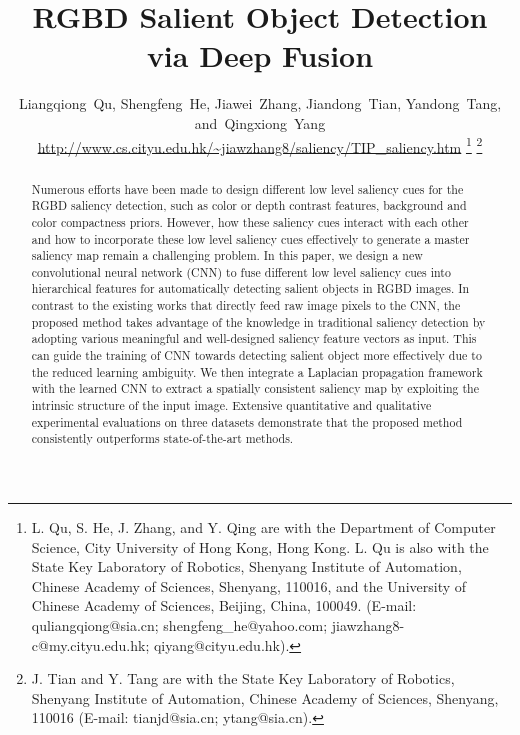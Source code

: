 \documentclass[journal]{IEEEtran}
\begin{document}
\title{RGBD Salient Object Detection via Deep Fusion}


\author{Liangqiong~Qu,
        Shengfeng~He,
        Jiawei~Zhang,
        Jiandong~Tian,
        Yandong~Tang,
        and~Qingxiong~Yang
        \\{\url{http://www.cs.cityu.edu.hk/~jiawzhang8/saliency/TIP_saliency.htm}} \thanks{L. Qu, S. He, J. Zhang, and Y. Qing are with the Department of Computer Science, City University of Hong Kong, Hong Kong. L. Qu
is also with the State Key Laboratory of Robotics, Shenyang Institute of Automation, Chinese Academy of Sciences, Shenyang, 110016, and the University of Chinese Academy of Sciences, Beijing, China, 100049. (E-mail: quliangqiong@sia.cn; shengfeng\_he@yahoo.com; jiawzhang8-c@my.cityu.edu.hk; qiyang@cityu.edu.hk).}
\thanks{J. Tian and Y. Tang are with the State Key Laboratory of Robotics,
Shenyang Institute of Automation, Chinese Academy of Sciences, Shenyang, 110016 (E-mail:
tianjd@sia.cn; ytang@sia.cn).}}



















\maketitle

\begin{abstract}
Numerous efforts have been made to design different low level saliency cues for the RGBD saliency detection, such as color or depth contrast features, background and color compactness priors. However, how these saliency cues interact with each other and how to incorporate these low level saliency cues effectively to generate a master saliency map remain a challenging problem.
In this paper, we design a new convolutional neural network (CNN) to fuse different low level saliency cues into hierarchical features for automatically detecting salient objects in RGBD images. In contrast to the existing works that directly feed raw image pixels to the CNN, the proposed method takes advantage of the knowledge in traditional saliency detection by adopting various meaningful and well-designed saliency feature vectors as input. This can guide the training of CNN towards detecting salient object more effectively due to the reduced learning ambiguity. We then integrate a Laplacian propagation framework with the learned CNN to extract a spatially consistent saliency map by exploiting the intrinsic structure of the input image. Extensive quantitative and qualitative experimental evaluations on three datasets demonstrate that the proposed method consistently outperforms state-of-the-art methods.
\end{abstract}
\end{document}
